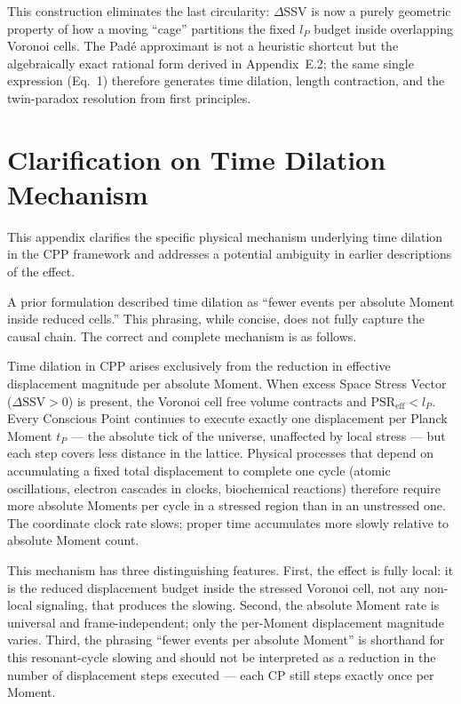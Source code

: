 \documentclass[11pt,letterpaper]{article}
\begin{document}
This construction eliminates the last circularity: \(\Delta\)SSV is now a purely geometric property of how a moving ``cage'' partitions the fixed \(l_P\) budget inside overlapping Voronoi cells. 
The Padé approximant is not a heuristic shortcut but the algebraically 
exact rational form derived in Appendix~E.2; the same single expression 
(Eq.~1) therefore generates time dilation, length contraction, and the 
twin-paradox resolution from first principles.


\section{Clarification on Time Dilation Mechanism}\label{app:B}

This appendix clarifies the specific physical mechanism underlying time dilation in the CPP framework and addresses a potential ambiguity in 
earlier descriptions of the effect.

A prior formulation described time dilation as ``fewer events per absolute Moment inside reduced cells.'' This phrasing, while concise, does not fully capture the causal chain. The correct and complete mechanism is as follows.

Time dilation in CPP arises exclusively from the reduction in effective displacement magnitude per absolute Moment. When excess Space Stress 
Vector ($\Delta\text{SSV} > 0$) is present, the Voronoi cell free volume contracts and $\text{PSR}_{\text{eff}} < l_P$. Every Conscious Point continues to execute exactly one displacement per Planck Moment $t_P$ --- the absolute tick of the universe, unaffected by local stress --- but each step covers less distance in the lattice. Physical processes that depend on accumulating a fixed total displacement to complete one cycle (atomic oscillations, electron cascades in clocks, biochemical reactions) therefore require more absolute Moments per cycle in a stressed region than in an unstressed one. The coordinate clock rate slows; proper time accumulates more slowly relative to absolute Moment count.

This mechanism has three distinguishing features. First, the effect is fully local: it is the reduced displacement budget inside the stressed 
Voronoi cell, not any non-local signaling, that produces the slowing. Second, the absolute Moment rate is universal and frame-independent; only the per-Moment displacement magnitude varies. Third, the phrasing ``fewer events per absolute Moment'' is shorthand for this resonant-cycle slowing and should not be interpreted as a reduction in the number of displacement steps executed --- each CP still steps exactly once per Moment.
\end{document}

